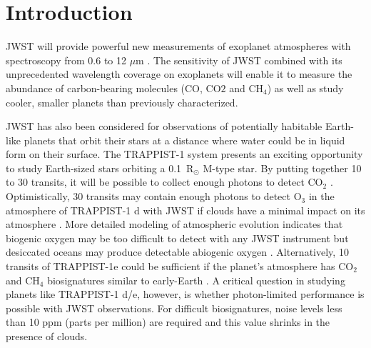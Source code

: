 \documentclass[]{aastex62}
\begin{document}

\section{Introduction} \label{sec:intro}

JWST will provide powerful new measurements of exoplanet atmospheres with spectroscopy from 0.6 to 12 $\mu$m
\citep{beichman2014pasp,greene2016jwst_trans,howe2017informationJWST,barstow2015jwstSystematics,schlawin2018JWSTforecasts}.
The sensitivity of JWST combined with its unprecedented wavelength coverage on exoplanets will enable it to measure the abundance of carbon-bearing molecules (CO, CO$2$ and CH$_4$) as well as study cooler, smaller planets than previously characterized.

JWST has also been considered for observations of potentially habitable Earth-like planets that orbit their stars at a distance where water could be in liquid form on their surface.
The TRAPPIST-1 system \citep{gillon2016trappist1Discovery,gillon2017trappist-1sevenp} presents an exciting opportunity to study Earth-sized stars orbiting a 0.1~R$_\odot$ M-type star.
By putting together 10 to 30 transits, it will be possible to collect enough photons to detect CO$_2$ \citep{barstow2016trappist1habitable,krissansen-totton2018trappist1eJWST,lustig-yaeger2019detectabilityTRAPPIST-1}.
Optimistically, 30 transits may contain enough photons to detect O$_3$ in the atmosphere of TRAPPIST-1 d with JWST if clouds have a minimal impact on its atmosphere \citep{barstow2016trappist1habitable}.
More detailed modeling of atmospheric evolution indicates that biogenic oxygen may be too difficult to detect with any JWST instrument but desiccated oceans may produce detectable abiogenic oxygen \citep{lustig-yaeger2019detectabilityTRAPPIST-1}.
Alternatively, 10 transits of TRAPPIST-1e could be sufficient if the planet's atmosphere has CO$_2$ and CH$_4$ biosignatures similar to early-Earth \citep{krissansen-totton2018trappist1eJWST}.
A critical question in studying planets like TRAPPIST-1 d/e, however, is whether photon-limited performance is possible with JWST observations.
For difficult biosignatures, noise levels less than 10 ppm (parts per million) are required and this value shrinks in the presence of clouds.
\end{document}
